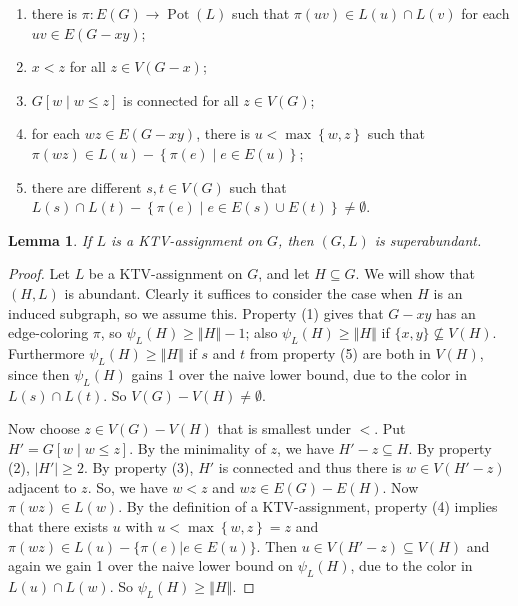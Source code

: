 \documentclass[12pt,reqno]{amsart}
\theoremstyle{plain}
\newtheorem{lem}[thm]{Lemma}
\theoremstyle{definition}
\theoremstyle{remark}
\newcommand{\set}[1]{\left\{ #1 \right\}}
\newcommand{\setbs}[2]{\left\{ #1 \mid #2 \right\}}
\newcommand{\card}[1]{\left|#1\right|}
\newcommand{\size}[1]{\left\Vert#1\right\Vert}
\newcommand{\func}[3]{#1\colon #2 \rightarrow #3}
\newcommand{\brackets}[1]{\left[ #1 \right]}
\newcommand{\pot}{\operatorname{Pot}}
\begin{document}
\begin{enumerate}
\item there is $\func{\pi}{E(G)}{\pot(L)}$ such that $\pi(uv) \in L(u) \cap L(v)$ for each $uv \in E(G - xy)$; 
\item $x < z$ for all $z \in V(G - x)$; 
\item $G\brackets{w \mid w \le z}$ is connected for all $z \in V(G)$; 
\item for each $wz \in E(G - xy)$, there is $u < \max\set{w, z}$ such that $\pi(wz) \in L(u) - \setbs{\pi(e)}{e \in E(u)}$;
\item there are different $s, t \in V(G)$ such that $L(s) \cap L(t) - \setbs{\pi(e)}{e \in E(s) \cup E(t)} \ne \emptyset$.
\end{enumerate}

\begin{lem}\label{KTVImpliesSuperabundant}
If $L$ is a KTV-assignment on $G$, then $(G, L)$ is superabundant.
\end{lem}
\begin{proof}
Let $L$ be a KTV-assignment on $G$, and let $H \subseteq G$.  We will show that
$(H,L)$ is abundant.  
Clearly it suffices to consider the case when $H$ is an induced subgraph, so we
assume this.
Property (1) gives that $G-xy$ has an edge-coloring
$\pi$, so $\psi_L(H)\ge \size{H}-1$; also $\psi_L(H)\ge \size{H}$ if
$\{x,y\}\not\subseteq V(H)$.  Furthermore $\psi_L(H)\ge \size{H}$ if $s$ and
$t$ from property (5) are both in $V(H)$, since then $\psi_L(H)$ gains 1 over
the naive lower bound, due to the color in $L(s)\cap L(t)$.  So $V(G)-
V(H)\ne \emptyset$.

Now choose $z \in V(G) - V(H)$ that is smallest under $<$.  
Put $H' = G\brackets{w \mid w \le z}$.  By the minimality of $z$, we have $H' - z \subseteq H$. By property (2), $\card{H'} \ge 2$.  
By property (3), $H'$ is connected and thus there is $w \in V(H' - z)$ adjacent to $z$. So, we have $w < z$ and $wz\in E(G)-E(H)$.
Now $\pi(wz)\in L(w)$.  By the definition of a KTV-assignment, 
property (4) implies that there exists $u$ with $u < \max\set{w, z} = z$ and $\pi(wz) \in
L(u)-\{\pi(e)|e\in E(u)\}$.  Then $u \in V(H' - z) \subseteq V(H)$ and
again we gain 1 over the naive lower bound on $\psi_L(H)$, due to the color
in $L(u)\cap L(w)$.  So $\psi_L(H)\ge \size{H}$.
\end{proof}
\end{document}
